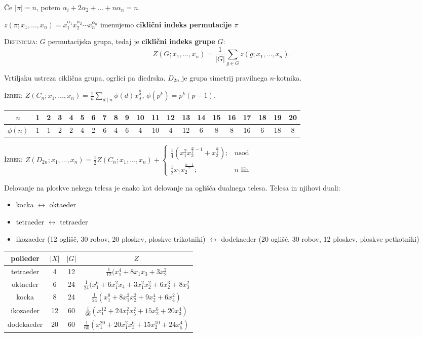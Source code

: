 \documentclass[8pt,a4paper]{amsart}
\theoremstyle{definition} %
\theoremstyle{plain} %
\begin{document}
Če $|\pi| = n$, potem $\alpha_i + 2\alpha_2 + \ldots + n\alpha_n= n$.

$z(\pi ; x_1,\ldots ,x_n)=x_1^{\alpha_1}x_2^{\alpha_2}\cdots x_n^{\alpha_n}$
imenujemo \textbf{ciklični indeks permutacije $\pi$}

\textsc{Definicija:} $G$ permutacijska grupa, tedaj je \textbf{ciklični indeks
grupe} $G$:
$$ Z(G;x_1,\ldots ,x_n) = \frac{1}{|G|} \sum_{g\in G} z(g;x_1,\ldots ,x_n).$$

Vrtiljaku ustreza ciklična grupa, ogrlici pa diedrska. $D_{2n}$ je grupa
simetrij pravilnega $n$-kotnika.

\textsc{Izrek:} $Z(C_n; x_1,\ldots, x_n) = \frac{1}{n} \displaystyle \sum_{d
\mid n} \phi (d)x_d^{\frac{n}{d}}$, \quad $\phi(p^k) = p^k(p-1)$.

\begin{tabular}[h!]{*{21}{|c}|} \hline
$n$ & 1 & 2 & 3 & 4 & 5 & 6 & 7 & 8 & 9 & 10 & 11 & 12 & 13 & 14 & 15 & 16 & 17 & 18 &
19 & 20 \\ \hline
$\phi(n)$ & 1 & 1 & 2 & 2 & 4 & 2 & 6 & 4 & 6 & 4 & 10 & 4 & 12 & 6    & 8 & 8  & 16 & 6 &
18 & 8  \\ \hline
\end{tabular}


\textsc{Izrek:} $Z(D_{2n}; x_1,\ldots,x_n) = \frac{1}{2} Z(C_n;x_1,\ldots,x_n) +
\begin{cases} \frac{1}{4}(x_1^2x_2^{\frac{n}{2}-1}+x_2^{\frac{n}{2}});& n \text{
  sod} \\ \frac{1}{2}x_1x_2^{\frac{n-1}{2}};& n \text{ lih} \end{cases}$

Delovanje na ploskve nekega telesa je enako kot delovanje na oglišča dualnega
telesa. Telesa in njihovi duali:
\begin{itemize}
  \item kocka $\leftrightarrow$ oktaeder
  \item tetraeder $\leftrightarrow$ tetraeder
  \item ikozaeder (12 oglišč, 30 robov, 20 ploskev, ploskve trikotniki) $\leftrightarrow$ dodekaeder (20
    oglišč, 30 robov, 12 ploskev, ploskve petkotniki)
\end{itemize}

\begin{tabular}{| c || c | c | c |}\hline
  polieder & $|X|$ & $|G|$ & $Z$ \\ \hline\hline
  tetraeder & 4 & 12 & $\frac{1}{12}(x_1^4+8x_1x_3 + 3x_2^2$\\ \hline
  oktaeder & 6 & 24 & $\frac{1}{24}(x_1^6+6x_1^2x_4 + 3x_1^2x_2^2+6x_2^3+8x_3^2$\\ \hline
  kocka & 8 & 24 & $\frac{1}{24}(x_1^8+8x_1^2x_2^2 + 9x_2^4 + 6x_4^2)$ \\ \hline
  ikozaeder & 12 & 60 & $\frac{1}{60}(x_1^{12} + 24x_1^2x_5^2 + 15x_2^6 + 20x_3^4)$ \\ \hline
  dodekaeder & 20 & 60 & $\frac{1}{60}(x_1^{20} + 20x_1^2x_3^6 + 15x_2^{10} + 24x_5^4)$ \\ \hline
\end{tabular}
\end{document}
